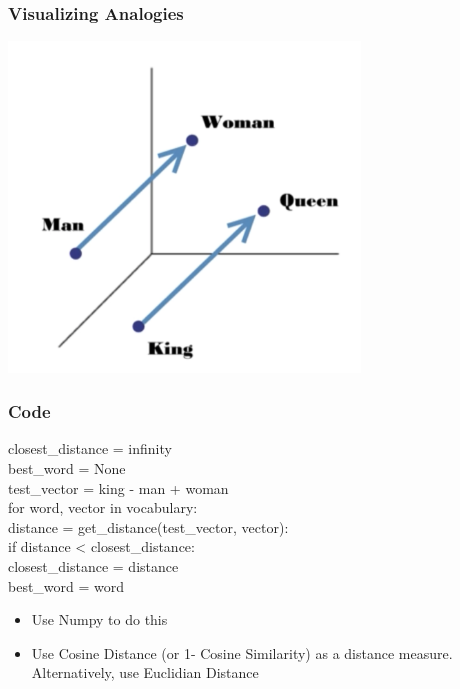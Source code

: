 \documentclass[compress, aspectratio=54]{beamer}
\begin{document}
\begin{frame}
\frametitle{Visualizing Analogies}

\begin{center}
    \includegraphics[width=0.7\textwidth]{Figures/visualizing-analogies}
\end{center}
\end{frame}
\begin{frame}
\frametitle{Code}

closest\_distance = infinity\\
best\_word = None\\
test\_vector = king - man + woman\\
for word, vector in vocabulary:\\
\hspace{10 mm}distance = get\_distance(test\_vector, vector):\\
\hspace{10 mm}if distance < closest\_distance:\\
\hspace{20 mm}closest\_distance = distance\\
\hspace{20 mm}best\_word = word\\
\vspace{10 mm}
\begin{itemize}
\item Use Numpy to do this
\item Use Cosine Distance  (or 1- Cosine Similarity) as a distance measure. Alternatively, use Euclidian Distance
\end{itemize}

\end{frame}
\end{document}
